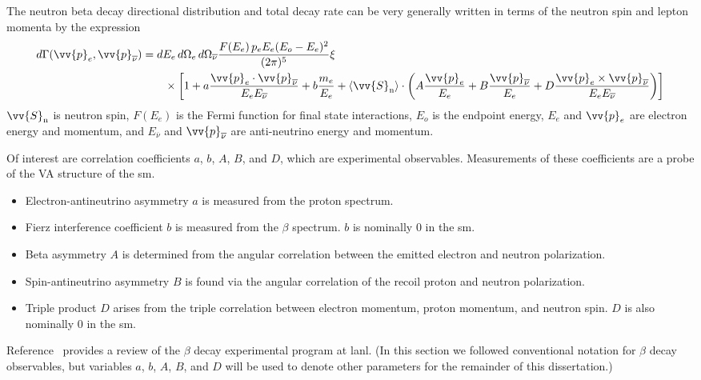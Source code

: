 The neutron beta decay directional distribution and total decay rate can be very generally written in terms of the neutron spin and lepton momenta by the expression~\cite{Young2014}
%
\begin{align}
    d\Gamma(\vv{p}_e, \vv{p}_{\overline{\nu}}) &= dE_e\,d\Omega_e \,d\Omega_{\overline{\nu}} \frac{F(E_e)\,p_e E_e (E_o-E_e)^2}{(2\pi)^5} \xi \nonumber \\
    &\quad\quad \times \left[1 + a\frac{\vv{p}_e \cdot \vv{p}_{\overline{\nu}}}{E_e E_{\overline{\nu}}}
    +b\frac{m_e}{E_e} + \langle \vv{S}_\text{n} \rangle \cdot
    \left( A\frac{\vv{p}_e}{E_e} + B \frac{\vv{p}_{\overline{\nu}}}{E_e} + D\frac{\vv{p}_e\times \vv{p}_{\overline{\nu}}}{E_e E_{\overline{\nu}}}
    \right) \right]
\end{align}
%
$\vv{S}_\text{n}$ is neutron spin, $F(E_e)$ is the Fermi function for final state interactions, $E_o$ is the endpoint energy, $E_e$ and $\vv{p}_e$ are electron energy and momentum, and $E_{\overline{\nu}}$ and $\vv{p}_{\overline{\nu}}$ are anti-neutrino energy and momentum.

Of interest are correlation coefficients $a$, $b$, $A$, $B$, and $D$, which are experimental observables. Measurements of these coefficients are a probe of the V\textendash A structure of the \acrshort{sm}. 
%
\begin{itemize}
    \item Electron-antineutrino asymmetry $a$ is measured from the proton spectrum.
    \item Fierz interference coefficient $b$ is measured from the $\beta$ spectrum. $b$ is nominally $0$ in the \acrshort*{sm}.
    \item Beta asymmetry $A$ is determined from the angular correlation between the emitted electron and neutron polarization.
    \item Spin-antineutrino asymmetry $B$ is found via the angular correlation of the recoil proton and neutron polarization.
    \item Triple product $D$ arises from the triple correlation between electron momentum, proton momentum, and neutron spin. $D$ is also nominally $0$ in the \acrshort*{sm}.
\end{itemize}

Reference~\cite{Young2014} provides a review of the $\beta$ decay experimental program at \acrshort{lanl}. (In this section we followed conventional notation for $\beta$ decay observables, but variables $a$, $b$, $A$, $B$, and $D$ will be used to denote other parameters for the remainder of this dissertation.) 


